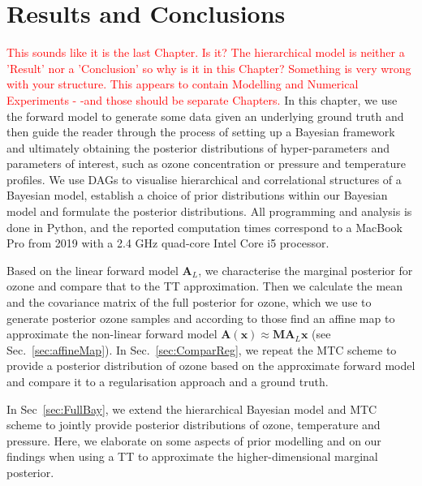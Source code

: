\chapter{Results and Conclusions}
\label{ch:res}
\textcolor{red}{This sounds like it is the last Chapter. Is it? The hierarchical model is neither a 'Result' nor a 'Conclusion' so why is it in this Chapter? Something is very wrong with your structure.
	This appears to contain Modelling and Numerical Experiments - -and those should be separate Chapters. }
In this chapter, we use the forward model to generate some data given an underlying ground truth and then guide the reader through the process of setting up a Bayesian framework and ultimately obtaining the posterior distributions of hyper-parameters and parameters of interest, such as ozone concentration or pressure and temperature profiles.
We use DAGs to visualise hierarchical and correlational structures of a Bayesian model, establish a choice of prior distributions within our Bayesian model and formulate the posterior distributions.
All programming and analysis is done in Python, and the reported computation times correspond to a MacBook Pro from 2019 with a 2.4 GHz quad-core Intel Core i5 processor.

Based on the linear forward model $\bm{A}_L$, we characterise the marginal posterior for ozone and compare that to the TT approximation.
Then we calculate the mean and the covariance matrix of the full posterior for ozone, which we use to generate posterior ozone samples and according to those find an affine map to approximate the non-linear forward model $\bm{A}(\bm{x}) \approx \bm{M} \bm{A}_{L} \bm{x}$ (see Sec.~\ref{sec:affineMap}).
In Sec.~\ref{sec:ComparReg}, we repeat the MTC scheme to provide a posterior distribution of ozone based on the approximate forward model and compare it to a regularisation approach and a ground truth.

In Sec~\ref{sec:FullBay}, we extend the hierarchical Bayesian model and MTC scheme to jointly provide posterior distributions of ozone, temperature and pressure.
Here, we elaborate on some aspects of prior modelling and on our findings when using a TT to approximate the higher-dimensional marginal posterior.

\clearpage

